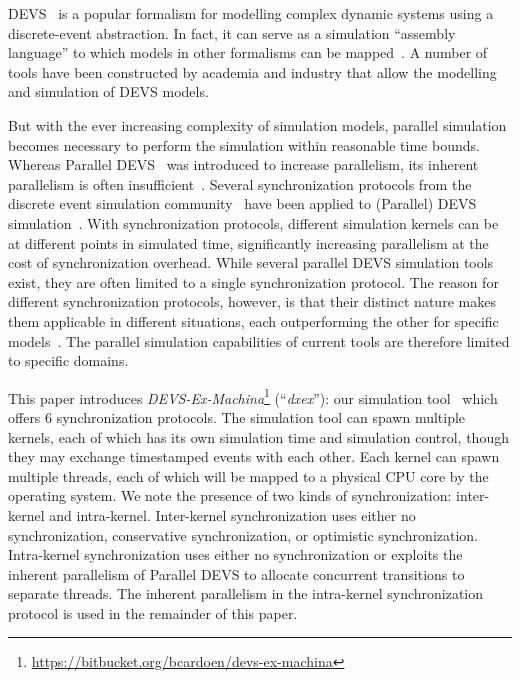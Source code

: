 \textsf{DEVS}~\cite{ClassicDEVS} is a popular formalism for modelling complex dynamic systems using a discrete-event abstraction.
In fact, it can serve as a simulation ``assembly language'' to which models in other formalisms can be mapped~\cite{DEVSbase}.
A number of tools have been constructed by academia and industry that allow the modelling and simulation of \textsf{DEVS} models.

But with the ever increasing complexity of simulation models, parallel simulation becomes necessary to perform the simulation within reasonable time bounds.
Whereas \textsf{Parallel DEVS}~\cite{ParallelDEVS} was introduced to increase parallelism, its inherent parallelism is often insufficient~\cite{Himmelspach}.
Several synchronization protocols from the discrete event simulation community~\cite{FujimotoBook} have been applied to (\textsf{Parallel}) \textsf{DEVS} simulation~\cite{globaltimewarp}.
With synchronization protocols, different simulation kernels can be at different points in simulated time, significantly increasing parallelism at the cost of synchronization overhead.
While several parallel \textsf{DEVS} simulation tools exist, they are often limited to a single synchronization protocol.
The reason for different synchronization protocols, however, is that their distinct nature makes them applicable in different situations, each outperforming the other for specific models~\cite{Jafer}.
The parallel simulation capabilities of current tools are therefore limited to specific domains.

This paper introduces \textit{DEVS-Ex-Machina}\footnote{\url{https://bitbucket.org/bcardoen/devs-ex-machina}} (``\textit{dxex}''): our simulation tool~\cite{dxex} which offers 6 synchronization protocols.
The simulation tool can spawn multiple kernels, each of which has its own simulation time and simulation control, though they may exchange timestamped events with each other.
Each kernel can spawn multiple threads, each of which will be mapped to a physical CPU core by the operating system.
We note the presence of two kinds of synchronization: inter-kernel and intra-kernel.
Inter-kernel synchronization uses either no synchronization, conservative synchronization, or optimistic synchronization.
Intra-kernel synchronization uses either no synchronization or exploits the inherent parallelism of Parallel DEVS to allocate concurrent transitions to separate threads.
The inherent parallelism in the intra-kernel synchronization protocol is used \pSim in the remainder of this paper.

